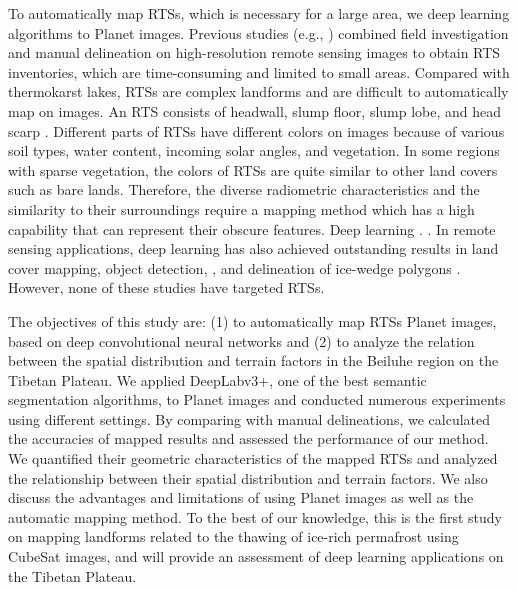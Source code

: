 \documentclass[authoryear,preprint,review,12pt]{elsarticle}
\begin{document}
To automatically map RTSs, which is necessary for a large area, we  deep learning algorithms to Planet images. Previous studies (e.g., \citealp{ramage_terrain_2017, lantuit_fifty_2008, niu2014thaw}) combined field investigation and manual delineation on high-resolution remote sensing images to obtain RTS inventories, which are time-consuming and limited to small areas. Compared with thermokarst lakes, RTSs are complex landforms and are difficult to automatically map on images. An RTS consists of headwall, slump floor, slump lobe, and head scarp \citep{lantuit_fifty_2008}. Different parts of RTSs have different colors on images because of various soil types, water content, incoming solar angles, and vegetation. In some regions with sparse vegetation, the colors of RTSs are quite similar to other land covers such as bare lands. Therefore, the diverse radiometric characteristics and the similarity to their surroundings require a mapping method which has a high capability that can represent their obscure features. Deep learning  . . In remote sensing applications, deep learning has also achieved outstanding results in land cover mapping, object detection, , and delineation of ice-wedge polygons . However, none of these studies have targeted RTSs. 

The objectives of this study are: (1) to automatically map RTSs  Planet images, based on deep convolutional neural networks and (2) to analyze the relation between the spatial distribution and terrain factors in the Beiluhe region on the Tibetan Plateau. We applied DeepLabv3+, one of the best semantic segmentation algorithms, to Planet images and conducted numerous experiments using different settings. By comparing with manual delineations, we calculated the accuracies of mapped results and assessed the performance of our method. We quantified their geometric characteristics of the mapped RTSs and analyzed the relationship between their spatial distribution and terrain factors. We also discuss the advantages and limitations of using Planet images as well as the automatic mapping method. 
To the best of our knowledge, this is the first study on mapping landforms related to the thawing of ice-rich permafrost using CubeSat images, and will provide an assessment of deep learning applications on the Tibetan Plateau.
\end{document}
